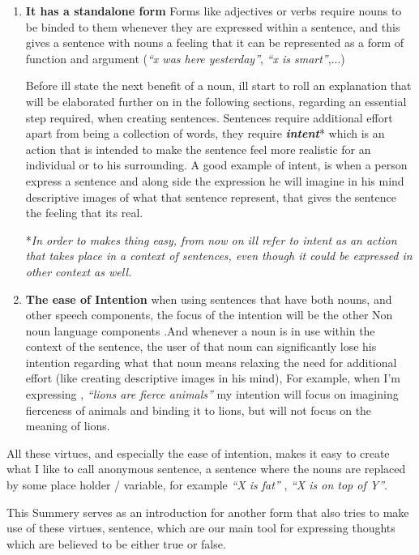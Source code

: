 \documentclass[10pt]{article}
\begin{document}
\begin{enumerate}
\item
\textbf{It has a standalone form}  Forms like adjectives or verbs require nouns to be binded to them whenever they are expressed within a sentence, and this gives a sentence with nouns a feeling that it can be represented as a form of function and argument (\textit{“x was here yesterday”}, \textit{“x is smart”},...)

\par
Before ill state the next benefit of a noun, ill start to roll an explanation that will be elaborated further on in the following sections, regarding an essential step required, when creating sentences. Sentences require additional effort apart from being a collection of words, they require \textbf{\textit{intent}}* which is an action that is intended to make the sentence feel more realistic for an individual or to his surrounding. A good example of intent, is when a person express a sentence and along side the expression he will imagine in his mind descriptive images of what that sentence represent, that gives the sentence the feeling that its real.

*\textit{In order to makes thing easy, from now on ill refer to intent as an action that takes place in a context of sentences, even though it could be expressed in other context as well.}

\item
\textbf{The ease of Intention}
when using sentences that have both nouns, and other speech components, the focus of the intention will be the other Non noun language components .And  whenever a noun is in use within the context of the sentence, the user of that noun can significantly lose his intention regarding what that noun means relaxing the need for additional effort (like  creating descriptive images in his mind),  For example, when I'm expressing , \textit{“lions are fierce animals”} my intention will focus on imagining fierceness of animals and binding it to lions, but will not focus on the meaning of lions.
\end{enumerate}

\par
All these virtues, and especially the ease of intention, makes it easy to create what I like to call anonymous sentence, a sentence where the nouns are replaced by some place holder / variable, for example \textit{“X is fat”} , \textit{“X is on top of Y”}.
\par
This Summery  serves as an introduction for another form that also tries to make use of these virtues, sentence, which are our main tool for expressing thoughts which are believed to be either true or false.
\end{document}
